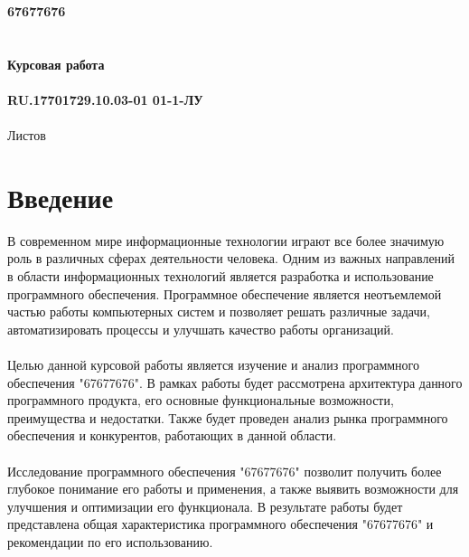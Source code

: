 \documentclass{article}
\begin{document}
\raggedright
\fontsize{14}{16}\selectfont
\thispagestyle{empty}
\clearpage
{}
\bigskip
\begin{center}
\topskip=0pt
\vspace*{\fill}
\textbf{67677676~\\
~\\
~\\
Курсовая работа\\
~\\
RU.17701729.10.03-01 01-1-ЛУ}\\
~\\
Листов \ztotpages\\
\vspace*{\fill}
\end{center}
\begin{center}
\end{center}
\newpage
\tableofcontents
\newpage
\newpage
\section{Введение}
В современном мире информационные технологии играют все более значимую роль в различных сферах деятельности человека. Одним из важных направлений в области информационных технологий является разработка и использование программного обеспечения. Программное обеспечение является неотъемлемой частью работы компьютерных систем и позволяет решать различные задачи, автоматизировать процессы и улучшать качество работы организаций.\\
~\\
Целью данной курсовой работы является изучение и анализ программного обеспечения "{}67677676"{}. В рамках работы будет рассмотрена архитектура данного программного продукта, его основные функциональные возможности, преимущества и недостатки. Также будет проведен анализ рынка программного обеспечения и конкурентов, работающих в данной области.\\
~\\
Исследование программного обеспечения "{}67677676"{} позволит получить более глубокое понимание его работы и применения, а также выявить возможности для улучшения и оптимизации его функционала. В результате работы будет представлена общая характеристика программного обеспечения "{}67677676"{} и рекомендации по его использованию.
\end{document}
